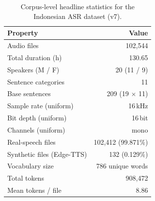 \begin{table}[!t]
  \centering
  \caption{Corpus-level headline statistics for the Indonesian ASR dataset (v7).}
  \label{tab:corpus_overview}
  \small
  \begin{tabular}{lr}
  \toprule
  Property & Value \\
  \midrule
  Audio files                  & 102,544 \\
  Total duration (h)           & 130.65 \\
  Speakers (M / F)             & 20 (11 / 9) \\
  Sentence categories          & 11 \\
  Base sentences               & 209 (19 $\times$ 11) \\
  Sample rate (uniform)        & 16\,kHz \\
  Bit depth (uniform)          & 16\,bit \\
  Channels (uniform)           & mono \\
  Real-speech files            & 102,412 (99.871\%) \\
  Synthetic files (Edge-TTS)   & 132 (0.129\%) \\
  Vocabulary size              & 786 unique words \\
  Total tokens                 & 908,472 \\
  Mean tokens / file           & 8.86 \\
  \bottomrule
  \end{tabular}
\end{table}
